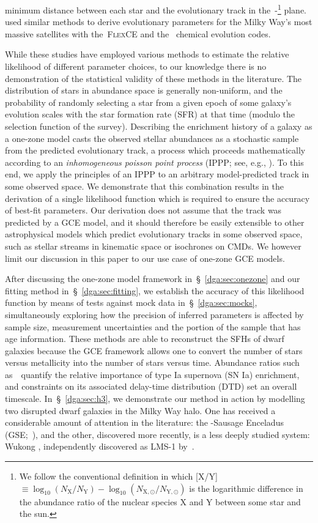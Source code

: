 minimum distance between each star and the evolutionary track in
the~\afe-\feh\footnote{
	We follow the conventional definition in which
	[X/Y]~$\equiv \log_{10}(N_\text{X} / N_\text{Y}) -
	\log_{10}(N_{\text{X},\odot} / N_{\text{Y},\odot})$
	is the logarithmic difference in the abundance ratio of the nuclear species
	X and Y between some star and the sun.
} plane.
\citet{Hasselquist2021} used similar methods to derive evolutionary parameters
for the Milky Way's most massive satellites with the~\textsc{FlexCE}
\citep{Andrews2017} and the~\citet{Lian2018, Lian2020b} chemical evolution
codes.
\par
While these studies have employed various methods to estimate the relative
likelihood of different parameter choices, to our knowledge there is no
demonstration of the statistical validity of these methods in the literature.
The distribution of stars in abundance space is generally non-uniform, and the
probability of randomly selecting a star from a given epoch of some galaxy's
evolution scales with the star formation rate (SFR) at that time (modulo the
selection function of the survey).
Describing the enrichment history of a galaxy as a one-zone model casts the
observed stellar abundances as a stochastic sample from the predicted
evolutionary track, a process which proceeds mathematically according to an
\textit{inhomogeneous poisson point process} (IPPP; see, e.g.,
\citealt{Press2007}).
To this end, we apply the principles of an IPPP to an arbitrary model-predicted
track in some observed space.
We demonstrate that this combination results in the derivation of a single
likelihood function which is required to ensure the accuracy of best-fit
parameters.
Our derivation does not assume that the track was predicted by a GCE model,
and it should therefore be easily extensible to other astrophysical models
which predict evolutionary tracks in some observed space, such as stellar
streams in kinematic space or isochrones on CMDs.
We however limit our discussion in this paper to our use case of one-zone GCE
models.
\par
After discussing the one-zone model framework in~\S~\ref{dga:sec:onezone} and
our fitting method in~\S~\ref{dga:sec:fitting}, we establish the accuracy of this
likelihood function by means of tests against mock data in~\S~\ref{dga:sec:mocks},
simultaneously exploring how the precision of inferred parameters is affected
by sample size, measurement uncertainties and the portion of the sample that
has age information.
These methods are able to reconstruct the SFHs of dwarf galaxies because the
GCE framework allows one to convert the number of stars versus metallicity into
the number of stars versus time.
Abundance ratios such as~\afe~quantify the relative importance of type Ia
supernova (SN Ia) enrichment, and constraints on its associated delay-time
distribution (DTD) set an overall timescale.
In~\S~\ref{dga:sec:h3}, we demonstrate our method in action by modelling two
disrupted dwarf galaxies in the Milky Way halo.
One has received a considerable amount of attention in the literature: the
\gaia-Sausage Enceladus (GSE;~\citealp{Belokurov2018, Helmi2018}), and the
other, discovered more recently, is a less deeply studied system: Wukong
\citep{Naidu2020, Naidu2022}, independently discovered as LMS-1
by~\citet{Yuan2020}.
